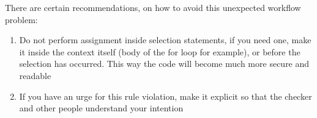 There are certain recommendations, on how to avoid this unexpected workflow problem:
 \begin{enumerate}[noitemsep]
  \item Do not perform assignment inside selection statements, if you need one, make it inside the context itself (body of the for loop for example), or before the selection has occurred. This way the code will become much more secure and readable 
  \item If you have an urge for this rule violation, make it explicit so that the checker and other people understand your intention
\end{enumerate}


